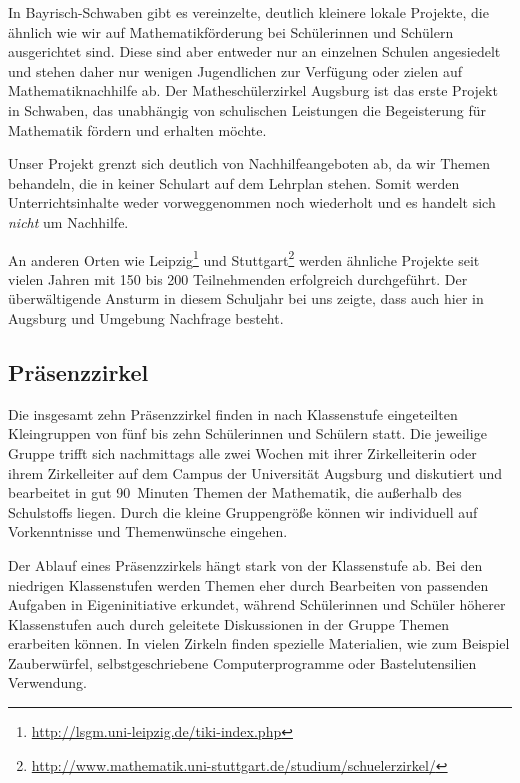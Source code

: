 \documentclass[12pt]{zettel}
\begin{document}
In Bayrisch-Schwaben gibt es vereinzelte, deutlich kleinere lokale
Projekte, die ähnlich wie wir auf Mathematikförderung bei Schülerinnen und
Schülern ausgerichtet sind. Diese sind aber entweder nur an einzelnen Schulen
angesiedelt und stehen daher nur wenigen Jugendlichen zur Verfügung oder zielen
auf Mathematiknachhilfe ab. Der Matheschülerzirkel Augsburg ist das erste
Projekt in Schwaben, das unabhängig von schulischen Leistungen die
Begeisterung für Mathematik fördern und erhalten möchte.

Unser Projekt grenzt sich deutlich von Nachhilfeangeboten ab, da wir Themen behandeln, die in keiner Schulart auf dem Lehrplan stehen. Somit werden Unterrichtsinhalte weder vorweggenommen noch wiederholt und es handelt sich \emph{nicht} um Nachhilfe.

An anderen Orten wie Leipzig\footnote{\href{http://lsgm.uni-leipzig.de/tiki-index.php}{\textsf{http:/\!/lsgm.uni-leipzig.de/tiki-index.php}}} und Stuttgart\footnote{\href{http://www.mathematik.uni-stuttgart.de/studium/schuelerzirkel/}{\textsf{http:/\!/www.mathematik.uni-stuttgart.de/studium/schuelerzirkel/}}} werden ähnliche Projekte seit
vielen Jahren mit 150 bis 200 Teilnehmenden erfolgreich durchgeführt. Der überwältigende Ansturm in
diesem Schuljahr bei uns zeigte, dass auch hier in Augsburg und Umgebung Nachfrage
besteht.

\subsection{Präsenzzirkel}

Die insgesamt zehn Präsenzzirkel finden in nach Klassenstufe eingeteilten
Kleingruppen von fünf bis zehn Schülerinnen und Schülern statt.
Die jeweilige Gruppe trifft sich nachmittags alle zwei Wochen mit ihrer Zirkelleiterin oder ihrem
Zirkelleiter auf dem Campus der Universität Augsburg und diskutiert und
bearbeitet in gut 90~Minuten Themen der Mathematik, die außerhalb des
Schulstoffs liegen. Durch die kleine Gruppengröße können wir individuell auf
Vorkenntnisse und Themenwünsche eingehen.

Der Ablauf eines Präsenzzirkels hängt stark von der Klassenstufe ab. Bei den
niedrigen Klassenstufen werden Themen eher durch Bearbeiten von passenden
Aufgaben in Eigeninitiative erkundet, während Schülerinnen und Schüler höherer
Klassenstufen auch durch geleitete Diskussionen in der Gruppe
Themen erarbeiten können. In vielen Zirkeln finden spezielle Materialien,
wie zum Beispiel Zauberwürfel, selbstgeschriebene Computerprogramme oder
Bastelutensilien Verwendung.
\end{document}
